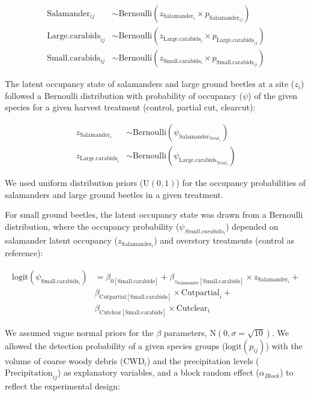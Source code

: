 \begin{align}
  \text{Salamander}_{ij} &\sim \text{Bernoulli}(z_{\text{Salamander}_i} \times p_{\text{Salamander}_{ij}}) \nonumber \\
  \text{Large.carabids}_{ij} &\sim \text{Bernoulli}(z_{\text{Large.carabids}_i} \times p_{\text{Large.carabids}_{ij}})  \\
  \text{Small.carabids}_{ij} &\sim \text{Bernoulli}(z_{\text{Small.carabids}_i} \times p_{\text{Small.carabids}_{ij}}) \nonumber
\end{align}


The latent occupancy state of salamanders and large ground beetles at a site ($z_{i}$) followed a Bernoulli distribution 
with probability of occupancy ($\psi$) of the given species for a given harvest treatment (control, partial cut, clearcut):


\begin{align}
  z_{\text{Salamander}_i} &\sim \text{Bernoulli}(\psi_{\text{Salamander}_{\text{Treat}_i}}) \nonumber \\
  z_{\text{Large.carabids}_i} &\sim \text{Bernoulli}(\psi_{\text{Large.carabids}_{\text{Treat}_i}})
\end{align}


We used uniform distribution priors ($\text{U}(0, 1)$) for the occupancy probabilities of salamanders and large ground beetles in a given treatment. 

For small ground beetles, the latent occupancy state was drawn from a Bernoulli distribution, where the occupancy probability ($\psi_{Small.carabids_{i}}$) 
depended on salamander latent occupancy ($z_{\text{Salamander}_i}$) and overstory treatments (control as reference):


\begin{align}
  \text{logit}(\psi_{\text{Small.carabids}_i}) &= \beta_{0[\text{Small.carabids}]} + \beta_{z_{\text{Salamander}}[\text{Small.carabids}]} \times z_{\text{Salamander}_i} + \nonumber \\
  &\beta_{\text{Cutpartial}[\text{Small.carabids}]} \times \text{Cutpartial}_i + \\
  &\beta_{\text{Cutclear}[\text{Small.carabids}]} \times \text{Cutclear}_i \nonumber
\end{align}

We assumed vague normal priors for the $\beta$ parameters, $\text{N}(0, \sigma = \sqrt{10})$. 
We allowed the detection probability of a given species groups ($\text{logit}(p_{ij})$) with the volume of coarse woody debris ($\text{CWD}_i$) and the precipitation levels 
($\text{Precipitation}_{ij}$) as explanatory variables, and a block random effect ($\alpha_{Block}$) to reflect the experimental design:


